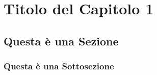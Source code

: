 \chapter{Titolo del Capitolo 1}

\section{Questa \`e una Sezione}


\subsection{Questa \`e una Sottosezione}

